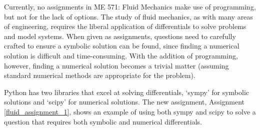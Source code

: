Currently, no assignments in ME 571: Fluid Mechanics make use of programming, but not for
the lack of options.
The study of fluid mechanics, as with many areas of engineering, requires the liberal 
application of differentials to solve problems and model systems. When given as
assignments, questions need to carefully crafted to ensure a symbolic solution can be found,
since finding a numerical solution is difficult and time-consuming. With the addition of
programming, however, finding a numerical solution becomes a trivial matter (assuming
standard numerical methods are appropriate for the problem).

Python has two libraries that excel at solving differentials, `sympy' for symbolic solutions 
and `scipy' for numerical solutions. The new assignment, Assignment \ref{fluid_assignment_1},
shows an example of using both sympy and scipy to solve a question that requires both
symbolic and numerical differentials. 

\label{fluid_assignment_1}

